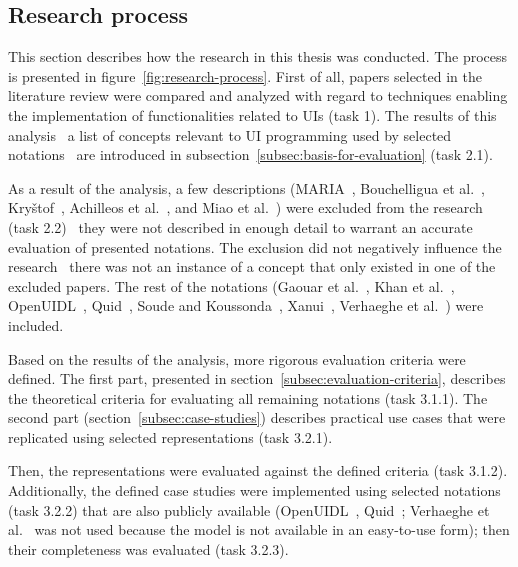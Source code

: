 \subsection{Research process}\label{subsec:research-process}

This section describes how the research in this thesis was conducted.
The process is presented in figure~\ref{fig:research-process}.
First of all, papers selected in the literature review were compared and analyzed with regard to techniques enabling the implementation of functionalities related to UIs (task 1).
The results of this analysis \textendash\ a list of concepts relevant to UI programming used by selected notations \textendash\ are introduced in subsection~\ref{subsec:basis-for-evaluation} (task 2.1).

As a result of the analysis, a few descriptions (MARIA~\cite{Paterno2009, MariaPDF}, Bouchelligua et al.~\cite{Bouchelligua2010}, Kryštof~\cite{kryvstof2010lpgm}, Achilleos et al.~\cite{Achilleos2011}, and Miao et al.~\cite{Miao2017}) were excluded from the research (task 2.2) \textendash\ they were not described in enough detail to warrant an accurate evaluation of presented notations.
The exclusion did not negatively influence the research \textendash\ there was not an instance of a concept that only existed in one of the excluded papers.
The rest of the notations (Gaouar et al.~\cite{Gaouar2018}, Khan et al.~\cite{Khan2021}, OpenUIDL~\cite{Moldovan2020}, Quid~\cite{molina2018quid, Molina2019}, Soude and Koussonda~\cite{Soude2022}, Xanui~\cite{hermida2016xanui}, Verhaeghe et al.~\cite{Verhaeghe2021visual, Verhaeghe2021behavior}) were included.

Based on the results of the analysis, more rigorous evaluation criteria were defined.
The first part, presented in section~\ref{subsec:evaluation-criteria}, describes the theoretical criteria for evaluating all remaining notations (task 3.1.1).
The second part (section~\ref{subsec:case-studies}) describes practical use cases that were replicated using selected representations (task 3.2.1).

Then, the representations were evaluated against the defined criteria (task 3.1.2).
Additionally, the defined case studies were implemented using selected notations (task 3.2.2) that are also publicly available (OpenUIDL~\cite{Moldovan2020}, Quid~\cite{molina2018quid, Molina2019}; Verhaeghe et al.~\cite{Verhaeghe2021visual, Verhaeghe2021behavior} was not used because the model is not available in an easy-to-use form);
then their completeness was evaluated (task 3.2.3).

